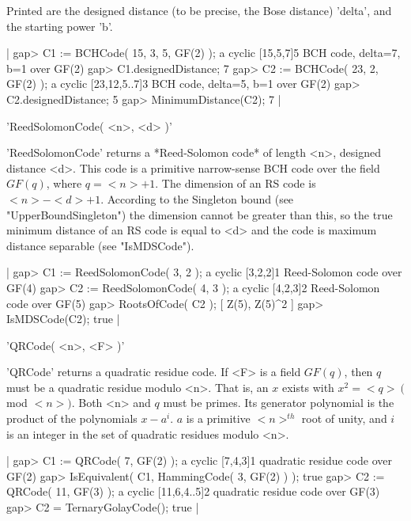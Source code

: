 Printed are  the designed distance  (to be  precise,  the Bose  distance)
'delta', and the starting power 'b'.

|    gap> C1 := BCHCode( 15, 3, 5, GF(2) );
    a cyclic [15,5,7]5 BCH code, delta=7, b=1 over GF(2)
    gap> C1.designedDistance;
    7
    gap> C2 := BCHCode( 23, 2, GF(2) );
    a cyclic [23,12,5..7]3 BCH code, delta=5, b=1 over GF(2)
    gap> C2.designedDistance;
    5
    gap> MinimumDistance(C2);
    7 |


'ReedSolomonCode( <n>, <d> )'

'ReedSolomonCode' returns a  *Reed-Solomon code* of length  <n>, designed
distance <d>. This  code  is a primitive  narrow-sense BCH  code over the
field $GF(q)$,  where  $q=<n>+1$.  The  dimension   of  an   RS code   is
$<n>-<d>+1$. According to the Singleton bound (see "UpperBoundSingleton")
the dimension cannot  be greater than this, so  the true minimum distance
of an RS code is equal to <d> and the code  is maximum distance separable
(see "IsMDSCode").

|    gap> C1 := ReedSolomonCode( 3, 2 );
    a cyclic [3,2,2]1 Reed-Solomon code over GF(4)
    gap> C2 := ReedSolomonCode( 4, 3 );
    a cyclic [4,2,3]2 Reed-Solomon code over GF(5)
    gap> RootsOfCode( C2 );
    [ Z(5), Z(5)^2 ]
    gap> IsMDSCode(C2);
    true |


'QRCode( <n>, <F> )'

'QRCode' returns a  quadratic residue code. If  <F>  is a field  $GF(q)$,
then $q$ must be a  quadratic residue modulo  <n>. That is, an $x$ exists
with $x^2=<q>\  ($mod  $<n>)$. Both  <n> and $q$   must  be primes.   Its
generator polynomial is the product of the  polynomials $x-a^i$. $a$ is a
primitive $<n>^{th}$ root of unity, and  $i$ is an  integer in the set of
quadratic residues modulo <n>.

|    gap> C1 := QRCode( 7, GF(2) );
    a cyclic [7,4,3]1 quadratic residue code over GF(2)
    gap> IsEquivalent( C1, HammingCode( 3, GF(2) ) );
    true
    gap> C2 := QRCode( 11, GF(3) );
    a cyclic [11,6,4..5]2 quadratic residue code over GF(3)
    gap> C2 = TernaryGolayCode();
    true |


